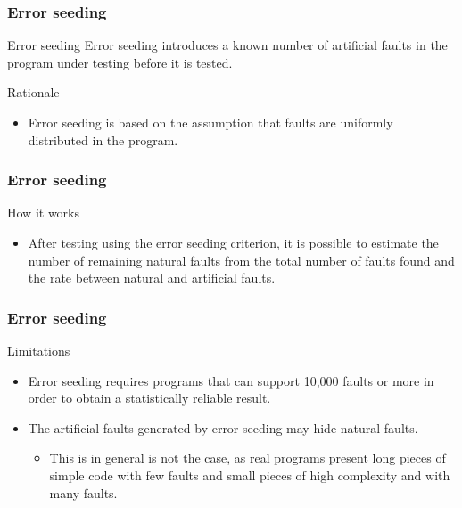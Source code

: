 \begin{frame}[parent={concept:fault-based-testing},hasprev=false,hasnext=true]
\frametitle{Error seeding}
\label{concept:error-seeding}

\begin{block:concept}{Error seeding}
Error seeding introduces a known number of artificial faults in the program
under testing before it is tested.
\end{block:concept}

\begin{block:fact}{Rationale}
\begin{itemize}
	\item Error seeding is based on the assumption that faults are uniformly
	distributed in the program.
\end{itemize}
\end{block:fact}
\end{frame}


\begin{frame}[hasprev=true,hasnext=true]
\frametitle{Error seeding}

\begin{block:fact}{How it works}
\begin{itemize}
	\item After testing using the error seeding criterion, it is possible to
	estimate the number of remaining natural faults from the total number of
	faults found and the rate between natural and artificial faults.
\end{itemize}
\end{block:fact}
\end{frame}



\begin{frame}[hasprev=true,hasnext=false]
\frametitle{Error seeding}

\begin{block:fact}{Limitations}
\begin{itemize}
	\item Error seeding requires programs that can support 10,000 faults or
	more in order to obtain a statistically reliable result.

	\item The artificial faults generated by error seeding may hide natural
	faults.
	\begin{itemize}
		\item This is in general is not the case, as real programs present
		long pieces of simple code with few faults and small pieces of high
		complexity and with many faults.
	\end{itemize}
\end{itemize}
\end{block:fact}
\end{frame}
